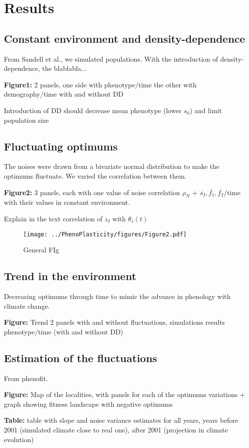 \label{sec:Res}
\section*{Results}

\subsection*{Constant environment and density-dependence}

From Sandell et al., we simulated populations. With the introduction of density-dependence, the blablabla...

\textbf{Figure1:} 2 panels, one side with phenotype/time the other with demography/time with and without DD

Introduction of DD should decrease mean phenotype (lower $s_{0}$) and limit population size

\subsection*{Fluctuating optimums}

The noises were drawn from a bivariate normal distribution to make the optimums fluctuate. We varied the correlation between them.

\textbf{Figure2:} 3 panels, each with one value of noise correlation $\rho_{N}$ + $\overline{s_{I}}, \overline{f_{1}}, \overline{f_{2}}$/time with their values in constant environment.

Explain in the text correlation of $z_{I}$ with $\theta_{s}(t)$

\begin{figure}[ht]
	\centering
	\texttt{[image: ../PhenoPlasticity/figures/Figure2.pdf]}
	\caption{General FIg}
\end{figure}

\subsection*{Trend in the environment}

Decreasing optimums through time to mimic the advance in phenology with climate change.

\textbf{Figure:} Trend 2 panels with and without fluctuations, simulations results phenotype/time (with and without DD)

\subsection*{Estimation of the fluctuations}

From phenofit.

\textbf{Figure:} Map of the localities, with panels for each of the optimums variations + graph showing fitness landscape with negative optimums

\textbf{Table:} table with slope and noise variance estimates for all years, years before 2001 (simulated climate close to real one), after 2001 (projection in climate evolution)